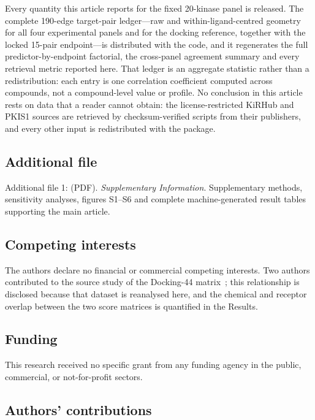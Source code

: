 \documentclass[11pt]{article}
\begin{document}
Every quantity this article reports for the fixed 20-kinase panel is released. The complete
190-edge target-pair ledger---raw and within-ligand-centred geometry for all four
experimental panels and for the docking reference, together with the locked 15-pair
endpoint---is distributed with the code, and it regenerates the full predictor-by-endpoint
factorial, the cross-panel agreement summary and every retrieval metric reported here. That
ledger is an aggregate statistic rather than a redistribution: each entry is one
correlation coefficient computed across compounds, not a compound-level value or profile.
No conclusion in this article rests on data that a reader cannot obtain: the
license-restricted KiRHub and PKIS1 sources are retrieved by checksum-verified scripts from
their publishers, and every other input is redistributed with the package.

\subsection*{Additional file}

Additional file 1:  (PDF). \textit{Supplementary
Information}. Supplementary methods, sensitivity analyses, figures S1--S6 and complete
machine-generated result tables supporting the main article.

\subsection*{Competing interests}

The authors declare no financial or commercial competing interests. Two authors contributed
to the source study of the Docking-44 matrix~\cite{nikitin2025}; this relationship is
disclosed because that dataset is reanalysed here, and the chemical and receptor overlap
between the two score matrices is quantified in the Results.

\subsection*{Funding}

This research received no specific grant from any funding agency in the public, commercial,
or not-for-profit sectors.

\subsection*{Authors' contributions}
\end{document}
